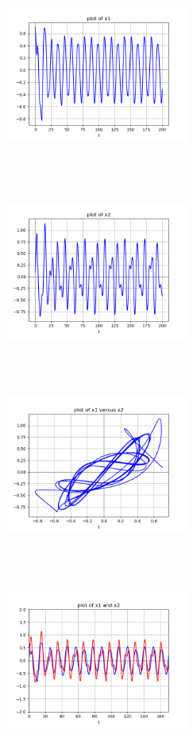 \documentclass{article}
\begin{document}
\begin{center}
  \includegraphics[width=6cm, height=6cm]{ej4_13.png}
\end{center}

\begin{center}
  \includegraphics[width=6cm, height=6cm]{ej4_14.png}
\end{center}

\begin{center}
  \includegraphics[width=6cm, height=6cm]{ej4_15.png}
\end{center}

\begin{center}
  \includegraphics[width=6cm, height=6cm]{ej4_16.png}
\end{center}
\end{document}
